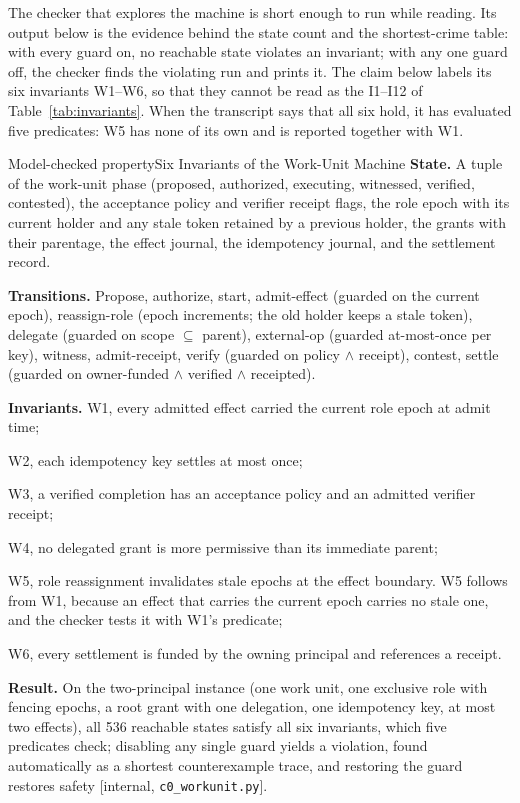 \documentclass[11pt,a4paper]{article}
\theoremstyle{definition}
\theoremstyle{remark}
\begin{document}


The checker that explores the machine is short enough to run while reading. Its
output below is the evidence behind the state count and the shortest-crime table:
with every guard on, no reachable state violates an invariant; with any one guard
off, the checker finds the violating run and prints it. The claim below labels
its six invariants W1--W6, so that they cannot be read as the
I1--I12 of Table~\ref{tab:invariants}. When the transcript says that all six
hold, it has evaluated five predicates: W5 has none of its own and is reported
together with W1.

\begingroup
\pdsessionwordwraptrue

\endgroup

\begin{pdclaim}{Model-checked property}{Six Invariants of the Work-Unit Machine}
\setlength{\parskip}{4pt plus 1pt}
\label{thm:workunit}
\textbf{State.} A tuple of the work-unit phase (proposed, authorized, executing, witnessed,
verified, contested), the acceptance policy and verifier receipt flags, the role epoch with
its current holder and any stale token retained by a previous holder, the grants with their
parentage, the effect journal, the idempotency journal, and the settlement record.

\textbf{Transitions.} Propose, authorize, start, admit-effect (guarded on the current
epoch), reassign-role (epoch increments; the old holder keeps a stale token), delegate
(guarded on scope $\subseteq$ parent), external-op (guarded at-most-once per key), witness,
admit-receipt, verify (guarded on policy $\wedge$ receipt), contest, settle (guarded on
owner-funded $\wedge$ verified $\wedge$ receipted).

\textbf{Invariants.}
W1, every admitted effect carried the current role epoch at admit time;

W2, each idempotency key settles at most once;

W3, a verified completion has an acceptance policy and an admitted verifier receipt;

W4, no delegated grant is more permissive than its immediate parent;

W5, role reassignment invalidates stale epochs at the effect boundary. W5
follows from W1, because an effect that carries the current epoch carries no
stale one, and the checker tests it with W1's predicate;

W6, every settlement is funded by the owning principal and references a receipt.

\textbf{Result.} On the two-principal instance (one work unit, one exclusive role with
fencing epochs, a root grant with one delegation, one idempotency key, at most two effects),
all 536 reachable states satisfy all six invariants, which five predicates check; disabling any single guard yields a
violation, found automatically as a shortest counterexample trace, and restoring the guard
restores safety [internal, \texttt{c0\_workunit.py}].
\end{pdclaim}
\end{document}
